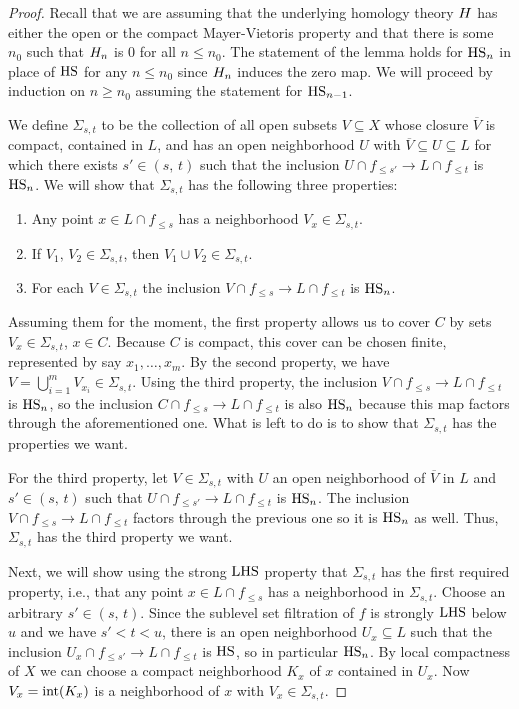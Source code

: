 \begin{proof}
	Recall that we are assuming that the underlying homology theory $H$ has either the open or the compact Mayer-Vietoris property and that there is some $n_0$ such that $H_{n}$ is 0 for all $n \leq n_0$.
    The statement of the lemma holds for $\mathrm{HS}_{n}$ in place of $\mathrm{HS}$ for any $n \leq n_0$ since $H_{n}$ induces the zero map.
    We will proceed by induction on $n \geq n_0$ assuming the statement for $\mathrm{HS}_{n-1}$.

    We define $\Sigma_{s, t}$ to be the collection of all open subsets $V \subseteq X$ whose closure $\overline{V}$ is compact, contained in $L$, and has an open neighborhood $U$ with 
	$\overline{V} \subseteq U \subseteq L$
	for which there exists $s' \in (s,\, t)$ such that the inclusion
    $U \cap f_{\leq s'} \to L \cap f_{\leq t}$
	is $\mathrm{HS}_n$.
	We will show that $\Sigma_{s, t}$ has the following three properties:
	\begin{enumerate}
	    \item Any point $x \in L \cap f_{\leq s}$ has a neighborhood $V_x \in \Sigma_{s,t}$.
	    \item If $V_1,\, V_2 \in \Sigma_{s,t}$, then $V_1 \cup V_2 \in \Sigma_{s,t}$.
	    \item For each $V \in \Sigma_{s,t}$ the inclusion 
	    $V \cap f_{\leq s} \to L \cap f_{\leq t}$ 
	    is $\mathrm{HS}_n$.
	\end{enumerate}
	
	Assuming them for the moment, the first property allows us to cover $C$ by sets $V_x \in \Sigma_{s,t}$, $x \in C$.
	Because $C$ is compact, this cover can be chosen finite, represented by say $x_1,\dots, x_m$.
	By the second property, we have $V = \bigcup_{i = 1}^m V_{x_i} \in \Sigma_{s,t}$.
	Using the third property, the inclusion 
	$V \cap f_{\leq s} \to L \cap f_{\leq t}$ 
	is $\mathrm{HS}_n$, so the inclusion 
	$C \cap f_{\leq s} \to L \cap f_{\leq t}$ 
	is also $\mathrm{HS}_n$ because this map factors through the aforementioned one.
	What is left to do is to show that $\Sigma_{s,t}$ has the properties we want.
	
	For the third property, let $V \in \Sigma_{s,t}$ with $U$ an open neighborhood of $\overline{V}$ in $L$ and $s' \in (s,\, t)$ such that 
	$U \cap f_{\leq s'} \to L \cap f_{\leq t}$
	is $\mathrm{HS}_n$.
	The inclusion
	$V \cap f_{\leq s} \to L \cap f_{\leq t}$
	factors through the previous one so it is $\mathrm{HS}_n$ as well.
	Thus, $\Sigma_{s, t}$ has the third property we want.
	
	Next, we will show using the strong $\mathrm{LHS}$ property that $\Sigma_{s, t}$ has the first required property, i.e., that any point $x \in L \cap f_{\leq s}$ has a neighborhood in $\Sigma_{s, t}$.
	Choose an arbitrary $s' \in (s,\, t)$.
	Since the sublevel set filtration of $f$ is strongly $\mathrm{LHS}$ below $u$ and we have $s' < t < u$, there is an open neighborhood $U_x \subseteq L$ such that the inclusion
	$U_x \cap f_{\leq s'} \to L \cap f_{\leq t}$
	is $\mathrm{HS}$, so in particular $\mathrm{HS}_n$.
	By local compactness of $X$ we can choose a compact neighborhood $K_x$ of $x$ contained in $U_x$.
	Now $V_x = \operatorname{int} (K_x)$ is a neighborhood of $x$ with $V_x \in \Sigma_{s,t}$.
	

\end{proof}
